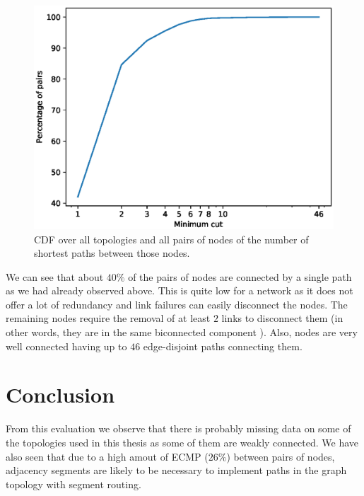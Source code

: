 \begin{figure}
\begin{center}
\includegraphics[width=.85\columnwidth]{./Network-lib/data/plot/minCuts.eps}
\end{center}
\caption{CDF over all topologies and all pairs of nodes of the number of shortest paths between those nodes.}
\label{fig:mincut}
\end{figure}

We can see that about $40\%$ of the pairs of nodes are connected by a single path as we had already observed above. This is quite low for a network as it does
not offer a lot of redundancy and link failures can easily disconnect the nodes. The remaining nodes require the removal of at least
$2$ links to disconnect them (in other words, they are in the same biconnected component \cite{Cormen:2009:IAT:1614191}). Also, nodes are very well connected having up to $46$ edge-disjoint paths connecting them.


\section*{Conclusion}

From this evaluation we observe that there is probably missing data on some of the topologies used in this
thesis as some of them are weakly connected. We have also seen that due to a high amout of ECMP ($26\%$) between pairs of nodes,
adjacency segments are likely to be necessary to implement paths in the graph topology with segment routing.
